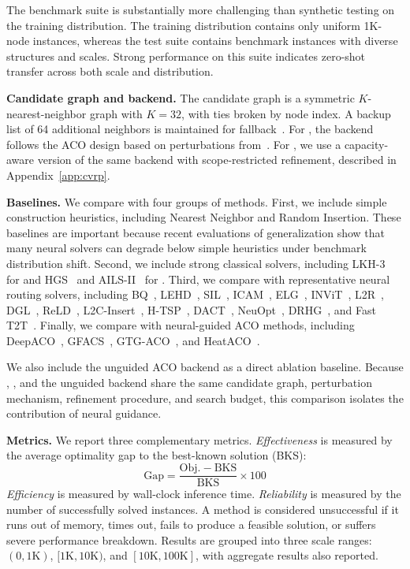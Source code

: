 The benchmark suite is substantially more challenging than synthetic testing on the training distribution. The training distribution contains only uniform 1K-node instances, whereas the test suite contains benchmark instances with diverse structures and scales. Strong performance on this suite indicates zero-shot transfer across both scale and distribution.

\smallskip\noindent\textbf{Candidate graph and backend.}
The candidate graph is a symmetric $K$-nearest-neighbor graph with $K{=}32$, with ties broken by node index. A backup list of 64 additional neighbors is maintained for fallback~\cite{ACOTSP-MF}. For \TSP{}, the backend follows the ACO design based on perturbations from~\cite{faco}. For \CVRP{}, we use a capacity-aware version of the same backend with scope-restricted refinement, described in Appendix~\ref{app:cvrp}.

\smallskip\noindent\textbf{Baselines.}
We compare with four groups of methods. First, we include simple construction heuristics, including Nearest Neighbor and Random Insertion. These baselines are important because recent evaluations of generalization show that many neural solvers can degrade below simple heuristics under benchmark distribution shift. Second, we include strong classical solvers, including LKH-3~\cite{lkhtsp,lkhcvrp} for \TSP{} and HGS~\cite{hgs} and AILS-II~\cite{ails2} for \CVRP{}. Third, we compare with representative neural routing solvers, including BQ~\cite{bq}, LEHD~\cite{lehd}, SIL~\cite{sil}, ICAM~\cite{icam}, ELG~\cite{elg}, INViT~\cite{invit}, L2R~\cite{l2r}, DGL~\cite{dgl}, ReLD~\cite{reld}, L2C-Insert~\cite{l2c}, H-TSP~\cite{htsp}, DACT~\cite{dact}, NeuOpt~\cite{neuopt}, DRHG~\cite{drhg}, and Fast T2T~\cite{fastt2t}. Finally, we compare with neural-guided ACO methods, including DeepACO~\cite{deepaco}, GFACS~\cite{gfacs}, GTG-ACO~\cite{gtgaco}, and HeatACO~\cite{heataco}.

We also include the unguided ACO backend as a direct ablation baseline. Because \DyNACO{}, \DyNACS{}, and the unguided backend share the same candidate graph, perturbation mechanism, refinement procedure, and search budget, this comparison isolates the contribution of neural guidance.

\smallskip\noindent\textbf{Metrics.}
We report three complementary metrics. \emph{Effectiveness} is measured by the average optimality gap to the best-known solution (BKS):
\begin{equation}
\mathrm{Gap} =
\frac{\mathrm{Obj.}-\mathrm{BKS}}{\mathrm{BKS}}
\times 100%
\end{equation}
\emph{Efficiency} is measured by wall-clock inference time. \emph{Reliability} is measured by the number of successfully solved instances. A method is considered unsuccessful if it runs out of memory, times out, fails to produce a feasible solution, or suffers severe performance breakdown. Results are grouped into three scale ranges: $(0,1\mathrm{K})$, $[1\mathrm{K},10\mathrm{K})$, and $[10\mathrm{K},100\mathrm{K}]$, with aggregate results also reported.

